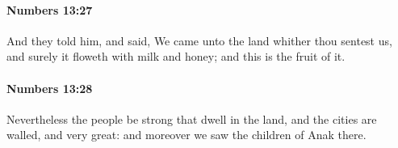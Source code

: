 		\paragraph{Numbers 13:27} %
			\label{NUMBERS-13-27}

			And they told him, and said, We came unto the land whither thou sentest us, and surely it floweth with milk and honey; and this is the fruit of it.


		\paragraph{Numbers 13:28} %
			\label{NUMBERS-13-28}

			Nevertheless the people be strong that dwell in the land, and the cities are walled, and very great: and moreover we saw the children of Anak there.


